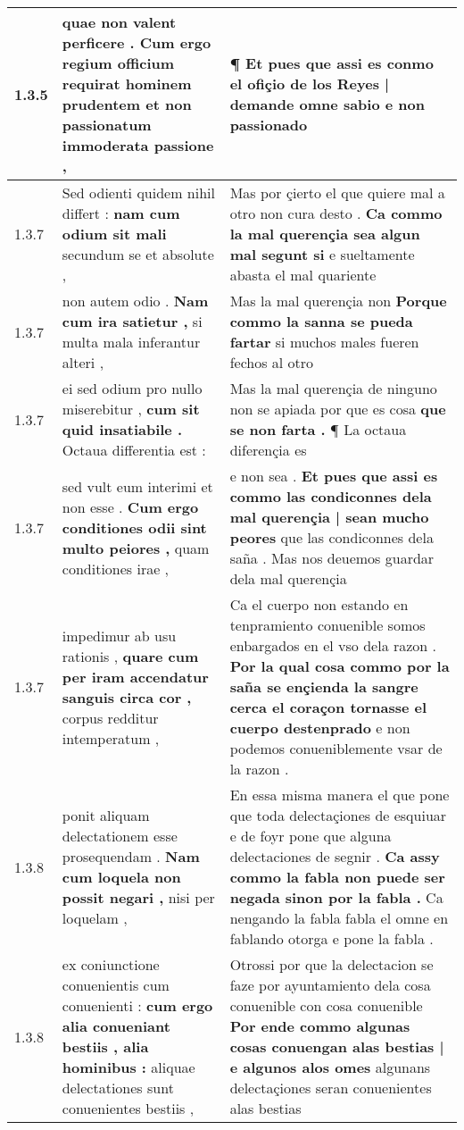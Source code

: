 \begin{tabular}{|p{1cm}|p{6.5cm}|p{6.5cm}|}
1.3.5 & quae non valent perficere . \textbf{ Cum ergo regium officium requirat hominem prudentem } et non passionatum immoderata passione , & ¶ \textbf{ Et pues que assi es conmo el ofiçio de los Reyes | demande omne sabio } e non passionado \\\hline
1.3.7 & Sed odienti quidem nihil differt : \textbf{ nam cum odium sit mali } secundum se et absolute , & Mas por çierto el que quiere mal a otro non cura desto . \textbf{ Ca commo la mal querençia sea algun mal segunt si } e sueltamente abasta el mal quariente \\\hline
1.3.7 & non autem odio . \textbf{ Nam cum ira satietur , } si multa mala inferantur alteri , & Mas la mal querençia non \textbf{ Porque commo la sanna se pueda fartar } si muchos males fueren fechos al otro \\\hline
1.3.7 & ei sed odium pro nullo miserebitur , \textbf{ cum sit quid insatiabile . } Octaua differentia est : & Mas la mal querençia de ninguno non se apiada por que es cosa \textbf{ que se non farta . } ¶ La octaua diferençia es \\\hline
1.3.7 & sed vult eum interimi et non esse . \textbf{ Cum ergo conditiones odii sint multo peiores , } quam conditiones irae , & e non sea . \textbf{ Et pues que assi es commo las condiconnes dela mal querençia | sean mucho peores } que las condiconnes dela saña . Mas nos deuemos guardar dela mal querençia \\\hline
1.3.7 & impedimur ab usu rationis , \textbf{ quare cum per iram accendatur sanguis circa cor , } corpus redditur intemperatum , & Ca el cuerpo non estando en tenpramiento conuenible somos enbargados en el vso dela razon . \textbf{ Por la qual cosa commo por la saña se ençienda la sangre cerca el coraçon tornasse el cuerpo destenprado } e non podemos conueniblemente vsar de la razon . \\\hline
1.3.8 & ponit aliquam delectationem esse prosequendam . \textbf{ Nam cum loquela non possit negari , } nisi per loquelam , & En essa misma manera el que pone que toda delectaçiones de esquiuar e de foyr pone que alguna delectaciones de segnir . \textbf{ Ca assy commo la fabla non puede ser negada sinon por la fabla . } Ca nengando la fabla fabla el omne en fablando otorga e pone la fabla . \\\hline
1.3.8 & ex coniunctione conuenientis cum conuenienti : \textbf{ cum ergo alia conueniant bestiis , alia hominibus : } aliquae delectationes sunt conuenientes bestiis , & Otrossi por que la delectacion se faze por ayuntamiento dela cosa conuenible con cosa conuenible \textbf{ Por ende commo algunas cosas conuengan alas bestias | e algunos alos omes } algunans delectaçiones seran conuenientes alas bestias \\\hline

\end{tabular}
